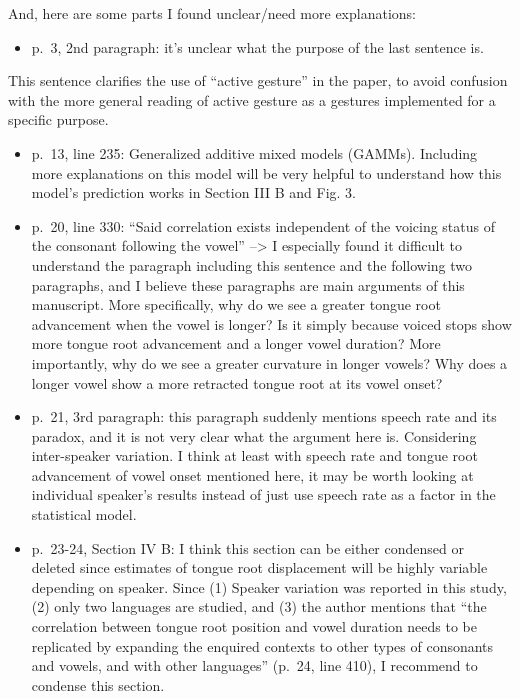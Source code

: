 \documentclass[]{article}
\providecommand{\tightlist}{%
  \setlength{\itemsep}{0pt}\setlength{\parskip}{0pt}}
\begin{document}
And, here are some parts I found unclear/need more explanations:

\begin{itemize}
\tightlist
\item
  p.~3, 2nd paragraph: it's unclear what the purpose of the last
  sentence is.
\end{itemize}

\color{plum}

This sentence clarifies the use of ``active gesture'' in the paper, to
avoid confusion with the more general reading of active gesture as a
gestures implemented for a specific purpose. \color{black}

\begin{itemize}
\item
  p.~13, line 235: Generalized additive mixed models (GAMMs). Including
  more explanations on this model will be very helpful to understand how
  this model's prediction works in Section III B and Fig. 3.
\item
  p.~20, line 330: ``Said correlation exists independent of the voicing
  status of the consonant following the vowel'' --\textgreater{} I
  especially found it difficult to understand the paragraph including
  this sentence and the following two paragraphs, and I believe these
  paragraphs are main arguments of this manuscript. More specifically,
  why do we see a greater tongue root advancement when the vowel is
  longer? Is it simply because voiced stops show more tongue root
  advancement and a longer vowel duration? More importantly, why do we
  see a greater curvature in longer vowels? Why does a longer vowel show
  a more retracted tongue root at its vowel onset?
\item
  p.~21, 3rd paragraph: this paragraph suddenly mentions speech rate and
  its paradox, and it is not very clear what the argument here is.
  Considering inter-speaker variation. I think at least with speech rate
  and tongue root advancement of vowel onset mentioned here, it may be
  worth looking at individual speaker's results instead of just use
  speech rate as a factor in the statistical model.
\item
  p.~23-24, Section IV B: I think this section can be either condensed
  or deleted since estimates of tongue root displacement will be highly
  variable depending on speaker. Since (1) Speaker variation was
  reported in this study, (2) only two languages are studied, and (3)
  the author mentions that ``the correlation between tongue root
  position and vowel duration needs to be replicated by expanding the
  enquired contexts to other types of consonants and vowels, and with
  other languages'' (p.~24, line 410), I recommend to condense this
  section.
\end{itemize}
\end{document}
